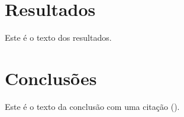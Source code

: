 \documentclass[12pt,a4paper,final]{article}
\begin{document}
    \section{Resultados}\label{sec:resultados}
    Este é o texto dos resultados.

    \begin{table}[h!]
        \centering
        \caption{Tabela Exemplo}
        \label{tab:my-table}
    \end{table}

    \section{Conclusões}\label{sec:conclusoes}
    Este é o texto da conclusão com uma citação (\cite{su15010857}).

    \newpage
    \printbibliography
\end{document}
